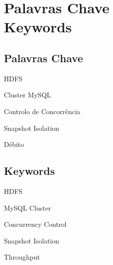 \chapter*{Palavras Chave \\ Keywords}
\thispagestyle{empty}

\section*{Palavras Chave}
{\large %

\noindent HDFS

\noindent Cluster MySQL

\noindent Controlo de Concorrência

\noindent Snapshot Isolation

\noindent Débito

}

\section*{Keywords}

{\large %

\noindent HDFS

\noindent MySQL Cluster

\noindent Concurrency Control

\noindent Snapshot Isolation

\noindent Throughput

}

\vfill

\cleardoublepage



\pagestyle{plain}



\def\contentsname{Index}
\tableofcontents
\newpage

\listoffigures
\newpage

\listoftables

\cleardoublepage


